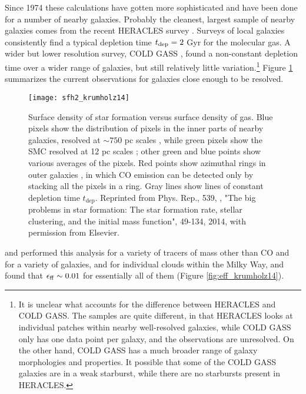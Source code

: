 Since 1974 these calculations have gotten more sophisticated and have been done for a number of nearby galaxies. Probably the cleanest, largest sample of nearby galaxies comes from the recent HERACLES survey \citep{leroy13a}. Surveys of local galaxies consistently find a typical depletion time $t_{\rm dep}=2$ Gyr for the molecular gas. A wider but lower resolution survey, COLD GASS \citep{saintonge11a, saintonge11b}, found a non-constant depletion time over a wider range of galaxies, but still relatively little variation.\footnote{It is unclear what accounts for the difference between HERACLES and COLD GASS. The samples are quite different, in that HERACLES looks at individual patches within nearby well-resolved galaxies, while COLD GASS only has one data point per galaxy, and the observations are unresolved. On the other hand, COLD GASS has a much broader range of galaxy morphologies and properties. It possible that some of the COLD GASS galaxies are in a weak starburst, while there are no starbursts present in HERACLES.} Figure \ref{fig:sfh2_krumholz14} summarizes the current observations for galaxies close enough to be resolved.


\begin{figure}
\texttt{[image: sfh2\_krumholz14]}
\caption[Surface densities of gas and star formation]{
\label{fig:sfh2_krumholz14}
Surface density of star formation versus surface density of gas. Blue pixels show the distribution of pixels in the inner parts of nearby galaxies, resolved at $\sim 750$ pc scales \citet{leroy13a}, while green pixels show the SMC resolved at 12 pc scales \citet{bolatto11a}; other green and blue points show various averages of the pixels. Red points show azimuthal rings in outer galaxies \citet{schruba11a}, in which CO emission can be detected only by stacking all the pixels in a ring. Gray lines show lines of constant depletion time $t_{\mathrm{dep}}$. Reprinted from Phys. Rep., 539, \citeauthor{krumholz14c}, "The big problems in star formation: The star formation rate, stellar clustering, and the initial mass function", 49-134, 2014, with permission from Elsevier.
}
\end{figure}

\citet{krumholz07e} and \citet{krumholz12a} performed this analysis for a variety of tracers of mass other than CO and for a variety of galaxies, and for individual clouds within the Milky Way, and found that $\epsilon_{\rm ff}\sim 0.01$ for essentially all of them (Figure \ref{fig:eff_krumholz14}).


